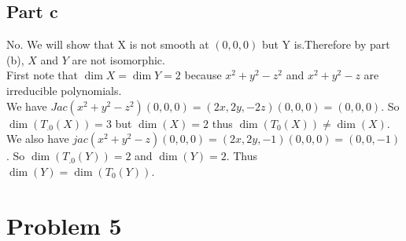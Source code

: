 \documentclass[12pt]{article}
\begin{document}
\subsection*{Part c}
No. We will show that X is not smooth at $(0,0,0)$ but Y is.Therefore by part (b), $X$ and $Y$ are not isomorphic. \\
First note that $\dim X= \dim Y=2$ because $x^2+y^2-z^2$ and $x^2+y^2-z$ are irreducible polynomials. \\
We have $Jac(x^2+y^2-z^2) (0,0,0) = (2x,2y,-2z) (0,0,0)=(0,0,0)$.
So $\dim (T_.0(X))=3$ but $\dim(X)=2$ thus $\dim (T_0(X)) \not= \dim(X)$. \\
We also have $jac(x^2+y^2-z)(0,0,0)=(2x,2y,-1)(0,0,0)=(0,0,-1)$. 
So $\dim (T_.0(Y))=2$ and $\dim(Y)=2$. Thus $\dim(Y)=\dim (T_0(Y))$.



\clearpage
\section*{Problem 5}
\end{document}
